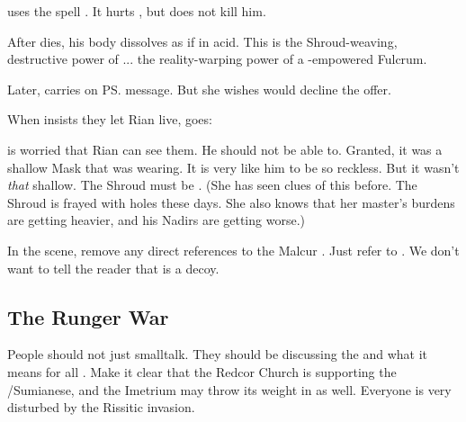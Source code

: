 \begin{garbage}
\begin{changes}
    \Ishnaruchaefir{} uses the spell . 
    It hurts \Teshrial, but does not kill him. 
    
    After \Teshrial{} dies, his body dissolves as if in acid. 
    This is the Shroud-weaving, destructive power of \Rystessakhin... the reality-warping power of a \xs-empowered Fulcrum.  
    
    Later, \Achsah{} carries on \ps{\Ishnaruchaefir} message. 
    But she wishes \Teshrial{} would decline the offer. 
    
    When \Criseis{} insists they let Rian live, \Ishnaruchaefir{} goes:
    
    \Criseis{} is worried that Rian can see them. 
    He should not be able to. 
    Granted, it was a shallow Mask that \Ishnaruchaefir{} was wearing. 
    It is very like him to be so reckless. 
    But it wasn't \emph{that} shallow. 
    The Shroud must be . 
    (She has seen clues of this before. 
     The Shroud is frayed with holes these days.
     She also knows that her master's burdens are getting heavier, and his Nadirs are getting worse.)
    
    In the \Psyrex{} scene, remove any direct references to the Malcur \nexus. 
    Just refer to . 
    We don't want to tell the reader that \Forklin{} is a decoy. 
\end{changes}









\subsection{The Runger War}
\begin{changes}
  \begin{comment}\paragraph{Daggers and \Daemons}\end{comment}
    People should not just smalltalk. 
    They should be discussing the  and what it means for all \Galessan. 
    Make it clear that the Redcor Church is supporting the \Scyrics/Sumianese, and the Imetrium may throw its weight in as well. 
    Everyone is very disturbed by the Rissitic invasion. 
    

\end{changes}
\end{garbage}
